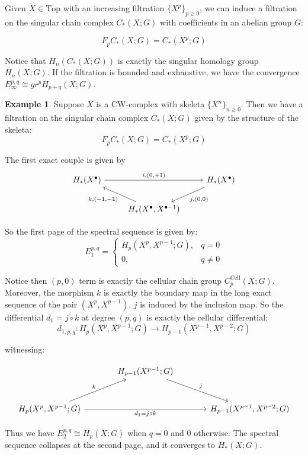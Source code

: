 \documentclass[12pt, reqno]{amsart}
\theoremstyle{definition}
\newtheorem{example}[theorem]{Example}
\theoremstyle{remark}
\numberwithin{equation}{section}
\begin{document}
{Given $X\in \mathrm{Top}$ with an increasing filtration $\{X^p\}_{p \geq 0}$, we can induce a filtration on the singular chain complex $C_*(X;G)$ with coefficients in an abelian group $G$:

\[F_p C_*(X;G) = C_*(X^p;G)\]

Notice that $H_n(C_*(X;G)) $ is exactly the singular homology group $H_n(X;G)$. If the filtration is bounded and exhaustive, we have the convergence $E_\infty^{p, q} \cong gr^p H_{p+q}(X;G)$.

\begin{example}
Suppose $X$ is a CW-complex with skeleta $\{X^n\}_{n \geq 0}$. Then we have a filtration on the singular chain complex $C_*(X;G)$ given by the structure of the skeleta:
\[F_p C_*(X;G) = C_*(X^p;G)\]

The first exact couple is given by
\[
\begin{tikzcd}
H_* (X^\bullet) \arrow[rr, "{i, (0, +1)}"] & & H_* (X^\bullet) \arrow[dl, "{j, (0, 0)}"] \\
& H_* (X^\bullet, X^{\bullet-1}) \arrow[ul, "{k, (-1, -1)}"] &
\end{tikzcd}
\]

So the first page of the spectral sequence is given by:
\[
E_{1}^{p, q} =
\begin{cases}
H_{p}(X^p, X^{p-1};G), & q = 0 \\
0, & q \neq 0
\end{cases}
\]


Notice then $(p,0)$ term is exactly the cellular chain group $C_p^{\mathrm{Cell}}(X;G)$. Moreover, the morphism $k$ is exactly the boundary map in the long exact sequence of the pair $(X^p, X^{p-1})$, $j$ is induced by the inclusion map. So the differential $d_1 = j \circ k$ at degree $(p, q)$ is exactly the cellular differential:
\[
d_{1, p, q}: H_{p}(X^p, X^{p-1};G) \to H_{p-1}(X^{p-1}, X^{p-2};G)
\]

witnessing: 

\[
\begin{tikzcd}[row sep=large, column sep=large]
& H_{p-1}(X^{p-1};G) \arrow[dr, "j"] & \\
H_{p}(X^p, X^{p-1};G) \arrow[ur, "k"] \arrow[rr, "d_1 = j \circ k"'] & & H_{p-1}(X^{p-1}, X^{p-2};G)
\end{tikzcd}
\]

Thus we have $E_{2}^{p, q} \cong H_p(X;G)$ when $q = 0$ and $0$ otherwise. The spectral sequence collapses at the second page, and it converges to $H_*(X;G)$.



\end{example}}
\end{document}
